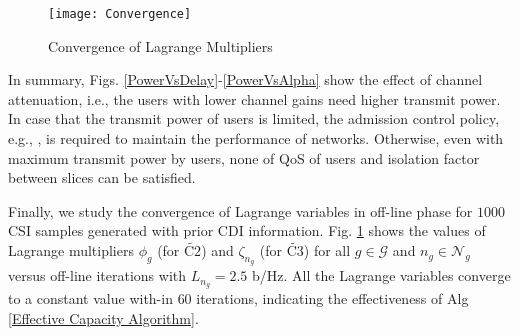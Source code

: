 \documentclass[journal,draftclsnofoot,12pt,onecolumn]{IEEEtran}
\begin{document}
\begin{figure}[]
    \centering
    \texttt{[image: Convergence]}
    \caption{Convergence of Lagrange Multipliers}
    \label{Convergence}
\end{figure}

{In summary, Figs. \ref{PowerVsDelay}-\ref{PowerVsAlpha} show the effect of channel attenuation, i.e., the users with lower channel gains need higher transmit power. In case that the transmit power of users is limited, the admission control policy, e.g., \cite{7127778}, is required to maintain the performance of networks. Otherwise, even with maximum transmit power by users, none of QoS of users and isolation factor between slices can be satisfied.}


Finally, we study the convergence of Lagrange variables in off-line phase for $1000$ CSI samples generated with prior CDI information. Fig. \ref{Convergence} shows the values of Lagrange multipliers $\phi_g$ (for $\widetilde{\text{C2}}$) and $\zeta_{n_g}$ (for $\widetilde{\text{C3}}$) for all $g \in \mathcal{G}$ and $n_g \in \mathcal{N}_g$ versus off-line iterations with $L_{n_g} = 2.5$ b/Hz. All the Lagrange variables converge to a constant value with-in $60$ iterations, indicating the effectiveness of Alg \ref{Effective Capacity Algorithm}.
\end{document}
